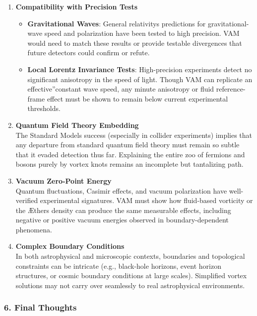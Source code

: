 \begin{enumerate}
    \item \textbf{Compatibility with Precision Tests}
    \begin{itemize}
        \item \textbf{Gravitational Waves}: General relativity\rqs s predictions for gravitational-wave speed and polarization have been tested to high precision. VAM would need to match these results or provide testable divergences that future detectors could confirm or refute.
        \item \textbf{Local Lorentz Invariance Tests}: High-precision experiments detect no significant anisotropy in the speed of light. Though VAM can replicate an \grqq effective\textquotedblright constant wave speed, any minute anisotropy or fluid reference-frame effect must be shown to remain below current experimental thresholds.
    \end{itemize}

    \item \textbf{Quantum Field Theory Embedding} \\
    The Standard Model\rqs s success (especially in collider experiments) implies that any departure from standard quantum field theory must remain so subtle that it evaded detection thus far. Explaining the entire zoo of fermions and bosons purely by vortex knots remains an incomplete but tantalizing path.

    \item \textbf{Vacuum Zero-Point Energy} \\
    Quantum fluctuations, Casimir effects, and vacuum polarization have well-verified experimental signatures. VAM must show how fluid-based vorticity or the Æther\rqs s density can produce the same measurable effects, including negative or positive vacuum energies observed in boundary-dependent phenomena.

    \item \textbf{Complex Boundary Conditions} \\
    In both astrophysical and microscopic contexts, boundaries and topological constraints can be intricate (e.g., black-hole horizons, event horizon structures, or cosmic boundary conditions at large scales). Simplified vortex solutions may not carry over seamlessly to real astrophysical environments.
\end{enumerate}

\subsubsection*{6. Final Thoughts}

